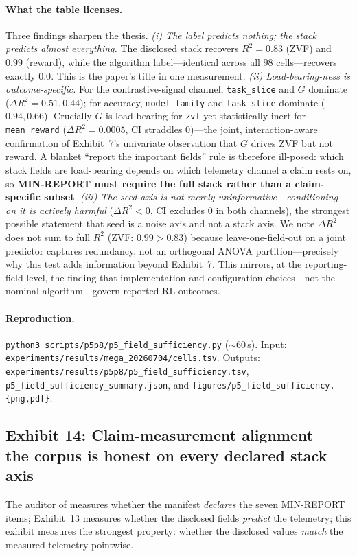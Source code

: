 \paragraph{What the table licenses.} Three findings sharpen the thesis.
\emph{(i) The label predicts nothing; the stack predicts almost everything.}
The disclosed stack recovers $R^{2}{=}0.83$ (ZVF) and $0.99$ (reward), while
the algorithm label---identical across all $98$ cells---recovers exactly
$0.0$. This is the paper's title in one measurement.
\emph{(ii) Load-bearing-ness is outcome-specific.} For the contrastive-signal
channel, \texttt{task\_slice} and $G$ dominate ($\Delta R^{2}{=}0.51,0.44$);
for accuracy, \texttt{model\_family} and \texttt{task\_slice} dominate
($0.94,0.66$). Crucially $G$ is load-bearing for \texttt{zvf} yet
statistically inert for \texttt{mean\_reward} ($\Delta R^{2}{=}0.0005$, CI
straddles $0$)---the joint, interaction-aware confirmation of Exhibit~7's
univariate observation that $G$ drives ZVF but not reward. A blanket ``report
the important fields'' rule is therefore ill-posed: which stack fields are
load-bearing depends on which telemetry channel a claim rests on, so
\textbf{MIN-REPORT must require the full stack rather than a claim-specific
subset}. \emph{(iii) The seed axis is not merely uninformative---conditioning
on it is actively harmful} ($\Delta R^{2}<0$, CI excludes $0$ in both
channels), the strongest possible statement that seed is a noise axis and not
a stack axis. We note $\Delta R^{2}$ does not sum to full $R^{2}$ (ZVF:
$0.99>0.83$) because leave-one-field-out on a joint predictor captures
redundancy, not an orthogonal ANOVA partition---precisely why this test adds
information beyond Exhibit~7. This mirrors, at the reporting-field level, the
\citet{henderson2018deep} finding that implementation and configuration
choices---not the nominal algorithm---govern reported RL outcomes.

\paragraph{Reproduction.}
\texttt{python3 scripts/p5p8/p5\_field\_sufficiency.py} ($\sim$60\,s). Input:
\texttt{experiments/results/mega\_20260704/cells.tsv}. Outputs:
\texttt{experiments/results/p5p8/p5\_field\_sufficiency.tsv},
\texttt{p5\_field\_sufficiency\_summary.json}, and
\texttt{figures/p5\_field\_sufficiency.\{png,pdf\}}.

\subsection{Exhibit 14: Claim-measurement alignment — the corpus is honest on every declared stack axis}
\label{sec:p5-exhibit-claim-measurement}
The auditor of  measures whether the
manifest \emph{declares} the seven MIN-REPORT items; Exhibit~13 measures
whether the disclosed fields \emph{predict} the telemetry; this exhibit
measures the strongest property: whether the disclosed values
\emph{match} the measured telemetry pointwise.

